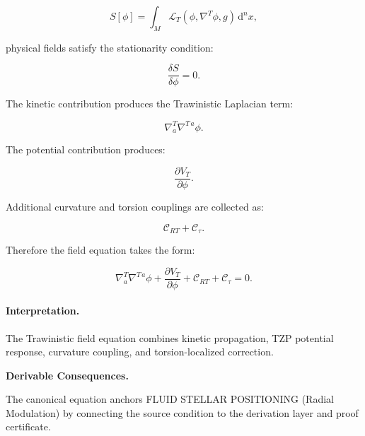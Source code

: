 \begin{equation}
S[\phi]
=
\int_M
\mathcal{L}_T
\left(
\phi,\nabla^T\phi,g
\right)
\,\mathrm{d}^n x ,
\end{equation}

physical fields satisfy the stationarity condition:

\begin{equation}
\frac{\delta S}{\delta\phi}=0 .
\end{equation}

The kinetic contribution produces the Trawinistic Laplacian term:

\begin{equation}
\nabla^T_a\nabla^{T\,a}\phi .
\end{equation}

The potential contribution produces:

\begin{equation}
\frac{\partial V_T}{\partial \phi}.
\end{equation}

Additional curvature and torsion couplings are collected as:

\begin{equation}
\mathcal{C}_{RT}
+
\mathcal{C}_{\tau}.
\end{equation}

Therefore the field equation takes the form:

\begin{equation}
\boxed{
\nabla^T_a\nabla^{T\,a}\phi
+
\frac{\partial V_T}{\partial \phi}
+
\mathcal{C}_{RT}
+
\mathcal{C}_{\tau}
=
0 .
}
\end{equation}

\paragraph{Interpretation.}
The Trawinistic field equation combines kinetic propagation, TZP potential response, curvature coupling, and torsion-localized correction.

\par\vspace{0.35em}
\noindent\textbf{Derivable Consequences.}\quad
\begingroup
\footnotesize
\raggedright
The canonical equation anchors FLUID STELLAR POSITIONING (Radial Modulation) by connecting the source condition to the derivation layer and proof certificate.
\par\endgroup

